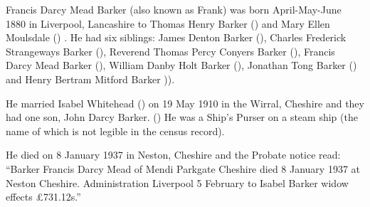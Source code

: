 
Francis Darcy Mead Barker (also known as Frank)  was born April-May-June 1880 in Liverpool, Lancashire to Thomas Henry Barker () and Mary Ellen Moulsdale ()  \cite{FBarkerBirth}. He had six siblings: James Denton Barker (), Charles Frederick Strangeways Barker (), Reverend Thomas Percy Conyers Barker (), Francis Darcy Mead Barker (), William Danby Holt Barker (), Jonathan Tong Barker () and Henry Bertram Mitford Barker )).

He married Isabel Whitehead () on 19 May 1910 in the Wirral, Cheshire \cite{FBarkerMarriage} and they had one son, John Darcy Barker. ()
He was a Ship's Purser on a steam ship (the name of which is not legible in the census record). \cite{FBarkerOccupation}

He died on 8 January 1937 in	Neston, Cheshire \cite{FBarkerDeath} and the Probate notice read:
``Barker Francis Darcy Mead of Mendi Parkgate Cheshire died 8 January 1937 at Neston Cheshire.
Administration Liverpool 5 February to Isabel Barker widow effects \pounds 731.12s.''
